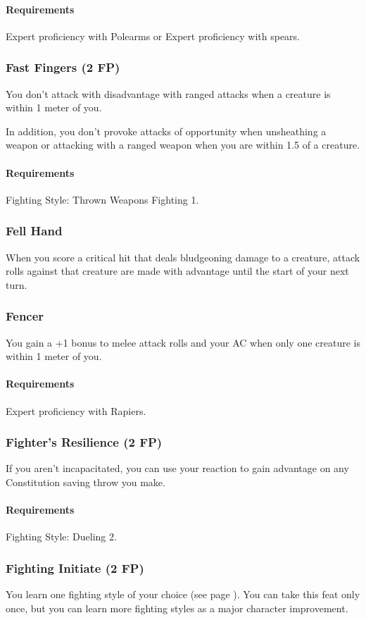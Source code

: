     \paragraph{Requirements} Expert proficiency with Polearms or Expert proficiency with spears.
\subsubsection{Fast Fingers (2 FP)} \label{feat::fastfingers}
    You don't attack with disadvantage with ranged attacks when a creature is within 1 meter of you.

    In addition, you don't provoke attacks of opportunity when unsheathing a weapon or attacking with a ranged weapon when you are within 1.5 of a creature.
    \paragraph{Requirements} Fighting Style: Thrown Weapons Fighting 1.
\subsubsection{Fell Hand} \label{feat::fellhand}
    When you score a critical hit that deals bludgeoning damage to a creature, attack rolls against that creature are made with advantage until the start of your next turn.
\subsubsection{Fencer} \label{feat::fencer}
    You gain a +1 bonus to melee attack rolls and your AC when only one creature is within 1 meter of you.
    \paragraph{Requirements} Expert proficiency with Rapiers.
\subsubsection{Fighter's Resilience (2 FP)} \label{feat::fightersresilience}
    If you aren't incapacitated, you can use your reaction to gain advantage on any Constitution saving throw you make.
    \paragraph{Requirements} Fighting Style: Dueling 2.
\subsubsection{Fighting Initiate (2 FP)} \label{feat::fightinginitiate}
    You learn one fighting style of your choice (see page \pageref{ssec::fightingstyles}).
    You can take this feat only once, but you can learn more fighting styles as a major character improvement.
